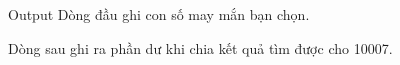 Output
Dòng đầu ghi con số may mắn bạn chọn.   


   Dòng sau ghi ra phần dư khi chia kết quả tìm được cho 10007.